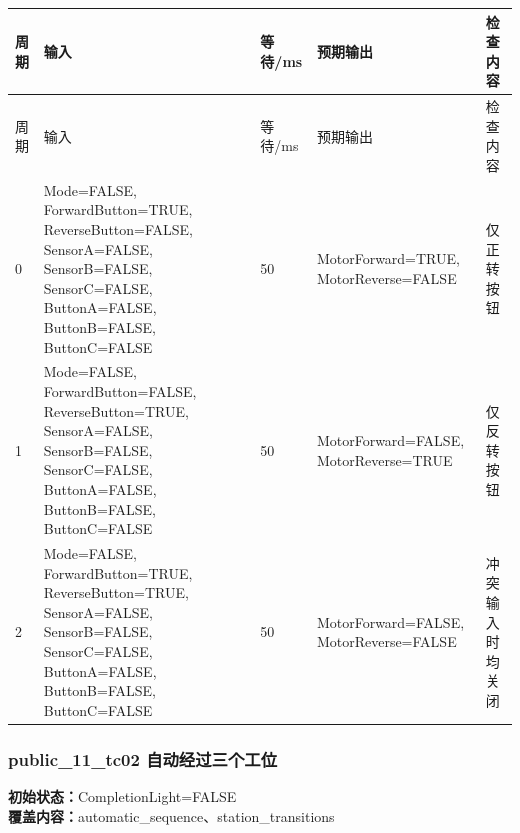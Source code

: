\begin{longtable}{L{1.0cm}L{4.7cm}L{1.4cm}L{4.0cm}L{2.1cm}}

\toprule

周期 & 输入 & 等待/ms & 预期输出 & 检查内容\\

\midrule

\endfirsthead

\toprule

周期 & 输入 & 等待/ms & 预期输出 & 检查内容\\

\midrule

\endhead

0 & Mode=FALSE, ForwardButton=TRUE, ReverseButton=FALSE, SensorA=FALSE, SensorB=FALSE, SensorC=FALSE, ButtonA=FALSE, ButtonB=FALSE, ButtonC=FALSE & 50 & MotorForward=TRUE, MotorReverse=FALSE & 仅正转按钮\\

1 & Mode=FALSE, ForwardButton=FALSE, ReverseButton=TRUE, SensorA=FALSE, SensorB=FALSE, SensorC=FALSE, ButtonA=FALSE, ButtonB=FALSE, ButtonC=FALSE & 50 & MotorForward=FALSE, MotorReverse=TRUE & 仅反转按钮\\

2 & Mode=FALSE, ForwardButton=TRUE, ReverseButton=TRUE, SensorA=FALSE, SensorB=FALSE, SensorC=FALSE, ButtonA=FALSE, ButtonB=FALSE, ButtonC=FALSE & 50 & MotorForward=FALSE, MotorReverse=FALSE & 冲突输入时均关闭\\

\bottomrule

\end{longtable}

\subsubsection{{\ttfamily public\_11\_tc02} 自动经过三个工位}

\noindent\textbf{初始状态：}CompletionLight=FALSE\\

\textbf{覆盖内容：}automatic\_sequence、station\_transitions

